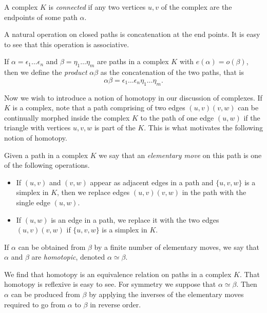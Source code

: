 \begin{definition}
  A complex $K$ is \emph{connected} if any two vertices $u,v$ of the complex are the endpoints of some path $\alpha$.
\end{definition}


A natural operation on closed paths is concatenation at the end points. It is easy to see that this operation is associative.

\begin{definition}
  If $\alpha = \epsilon_1 \dots \epsilon_n$ and $\beta = \eta_1 \dots \eta_m$ are paths in a complex $K$ with $e(\alpha) = o(\beta)$, then we define the \emph{product} $\alpha\beta$ as the concatenation of the two paths, that is
  \[
    \alpha\beta = \epsilon_1 \dots \epsilon_n\eta_1 \dots \eta_m.
  \]
\end{definition}

Now we wish to introduce a notion of homotopy in our discussion of complexes. If $K$ is a complex, note that a path comprising of two edges $(u,v)(v,w)$ can be continually morphed inside the complex $K$ to the path of one edge $(u,w)$ if the triangle with vertices $u,v,w$ is part of the $K$. This is what motivates the following notion of homotopy.

\begin{definition}
  Given a path in a complex $K$ we say that an \emph{elementary move} on this path is one of the following operations.
  \begin{itemize}
  \item If $(u,v)$ and $(v,w)$ appear as adjacent edges in a path and $\{u,v,w\}$ is a simplex in $K$, then we replace edges $(u,v)(v,w)$ in the path with the single edge $(u,w)$.
  \item If $(u,w)$ is an edge in a path, we replace it with the two edges $(u,v)(v,w)$ if $\{u,v,w\}$ is a simplex in $K$.
  \end{itemize}
  If $\alpha$ can be obtained from $\beta$ by a finite number of elementary moves, we say that $\alpha$ and $\beta$ are \emph{homotopic}, denoted $\alpha \simeq \beta$.
\end{definition}


We find that homotopy is an equivalence relation on paths in a complex $K$. That homotopy is reflexive is easy to see. For symmetry  we suppose that $\alpha \simeq \beta$. Then  $\alpha$ can be produced from $\beta$ by applying the inverses of the elementary moves required to go from $\alpha$ to $\beta$ in reverse order. 

